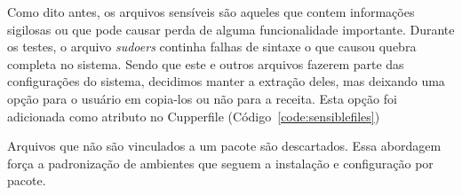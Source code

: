Como dito antes, os arquivos sensíveis são aqueles que contem
informações sigilosas ou que pode causar perda de alguma funcionalidade importante.
Durante os testes, o arquivo \textit{sudoers} continha falhas de sintaxe o que causou
quebra completa no sistema. Sendo que este e outros arquivos fazerem parte das
configurações do sistema, decidimos manter a extração deles, mas deixando uma opção
para o usuário em copia-los ou não para a receita. Esta opção foi adicionada como
atributo no Cupperfile (Código~\ref{code:sensiblefiles})

\noindent\begin{minipage}{\textwidth}
  \lstset{style=shell}
  
\end{minipage}\hfill

Arquivos que não são vinculados a um pacote são descartados. Essa abordagem força
a padronização de ambientes que seguem a instalação e configuração por pacote.


